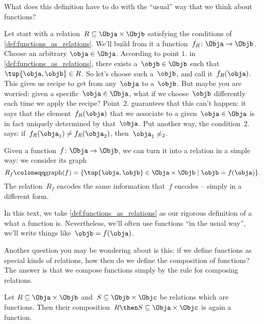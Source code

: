 What does this definition have to do with the ``usual'' way that we think about functions?

Let start with a relation~$R \subseteq \Obja \times \Objb$ satisfying the conditions of \cref{def:functions_as_relations}. We'll build from it a function~$f_R \colon \Obja \to \Objb$. Choose an arbitrary $\obja \in \Obja$. According to point $1.$ in \cref{def:functions_as_relations}, there exists a~$\objb \in \Objb$ such that~$\tup{\obja,\objb} \in R$. So let's choose such a~$\objb$, and call it~$f_R(\obja)$. This gives us recipe to get from any~$\obja$ to a~$\objb$. But maybe you are worried: given a specific~$\obja \in \Obja$, what if we choose~$\objb$ differently each time we apply the recipe? Point~$2.$ guarantees that this can't happen: it says that the element~$f_R(\obja)$ that we associate to a given~$\obja \in \Obja$ is in fact uniquely determined by that~$\obja$. Put another way, the condition~$2.$ says: if~$f_R(\obja_1) \neq f_R(\obja_2)$, then~$\obja_1 \neq _2$.

Given a function~$f \colon \Obja \rightarrow \Objb$, we can turn it into a relation in a simple way: we consider its graph
\begin{equation*}
    R_f \coloneqq \text{graph}(f) = \{ \tup{\obja,\objb} \in \Obja \times \Objb \mid \objb= f(\obja) \}.
\end{equation*}
The relation~$R_f$ encodes the same information that~$f$ encodes -- simply in a different form.

In this text, we take \cref{def:functions_as_relations} as our rigorous definition of a what a function is. Nevertheless, we'll often use functions ``in the usual way'',  we'll write things like~$\objb = f(\obja)$.

Another question you may be wondering about is this: if we define functions as special kinds of relations, how then do we define the composition of functions? The answer is that we compose functions simply by the rule for composing relations.

\begin{lemma}
    \label{lem:comprelfun}
    Let $R \subseteq \Obja \times \Objb$ and~$S \subseteq \Objb \times \Objc$ be relations which are functions. Then their composition~$R \then S \subseteq \Obja \times \Objc$ is again a function.
\end{lemma}

